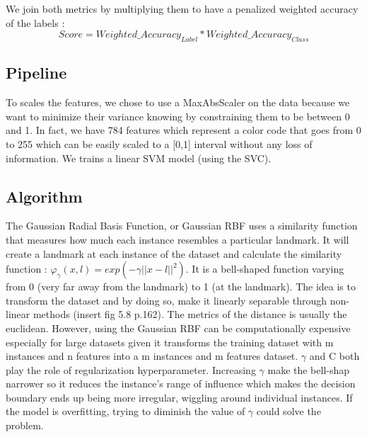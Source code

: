We join both metrics by multiplying them to have a penalized weighted accuracy of the labels : 
\begin{equation*}
	Score = Weighted\_Accuracy_{Label} *  Weighted\_Accuracy_{Class}
\end{equation*}

\subsection{Pipeline}
To scales the features, we chose to use a MaxAbsScaler on the data because we want to minimize their variance knowing by constraining them to be between 0 and 1. In fact, we have 784 features which represent a color code that goes from 0 to 255 which can be easily scaled to a [0,1] interval without any loss of information. We trains a linear SVM model (using the SVC). 

\subsection{Algorithm}
The Gaussian Radial Basis Function, or Gaussian RBF uses a similarity function that measures how much each instance resembles a particular landmark. It will create a landmark at each instance of the dataset and calculate the similarity function :  $\varphi_\gamma(x,l)= exp (-\gamma ||x-l||^2)$.
It is a bell-shaped function varying from 0 (very far away from the landmark) to 1 (at the landmark). The idea is to transform the dataset and by doing so, make it linearly separable through non-linear methods (insert fig 5.8 p.162).
The metrics of the distance is usually the euclidean.
However, using the Gaussian RBF can be computationally expensive especially for large datasets given it transforms the training dataset with m instances and n features into a m instances and m features dataset.
$\gamma$ and C both play the role of regularization hyperparameter. Increasing $\gamma$ make the bell-shap narrower so it reduces the instance's range of influence which makes the decision boundary ends up being more irregular, wiggling around individual instances.
If the model is overfitting, trying to diminish the value of $\gamma$ could solve the problem.